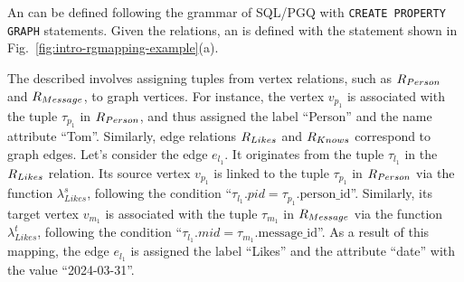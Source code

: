 \begin{example}
    \label{ex:rgmapping}
    An \rgmapping can be defined following the grammar of SQL/PGQ with \lstinline{CREATE PROPERTY GRAPH} statements.
    Given the relations, an \rgmapping is defined with the statement shown in Fig.~\ref{fig:intro-rgmapping-example}(a).

    The described \rgmapping involves assigning tuples from vertex relations, such as ${R_{Person}}$ and ${R_{Message}}$, to graph vertices. For instance, the vertex $v_{p_1}$ is associated with the tuple $\tau_{p_1}$ in ${R_{Person}}$, and thus assigned the label ``Person'' and the name attribute ``Tom''. Similarly, edge relations ${R_{Likes}}$ and ${R_{Knows}}$ correspond to graph edges.
    Let's consider the edge $e_{l_1}$. It originates from the tuple $\tau_{l_1}$ in the ${R_{Likes}}$ relation. Its source vertex $v_{p_1}$ is linked to the tuple $\tau_{p_1}$ in ${R_{Person}}$ via the function $\lambda_{Likes}^s$, following the condition ``$\tau_{l_1}.pid = \tau_{p_1}.\text{person\_id}$''. Similarly, its target vertex $v_{m_1}$ is associated with the tuple $\tau_{m_1}$ in ${R_{Message}}$ via the function $\lambda_{Likes}^t$, following the condition ``$\tau_{l_1}.mid = \tau_{m_1}.\text{message\_id}$''. As a result of this mapping, the edge $e_{l_1}$ is assigned the label ``Likes'' and the attribute ``date'' with the value ``2024-03-31''.
\end{example}

